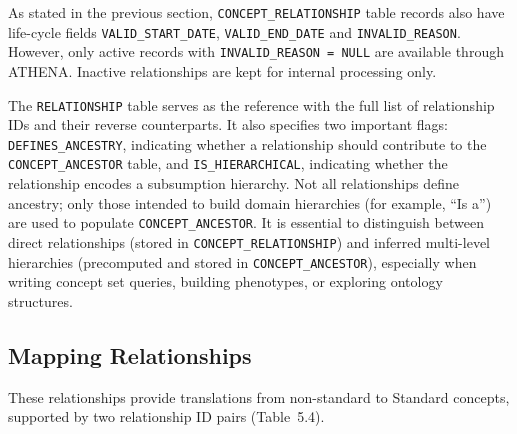 \documentclass[
  letterpaper,
  paper=7in:10in,
  pagesize=pdftex,
  headinclude=on,
  footinclude=on,
  12pt]{scrbook}
\begin{document}
As stated in the previous section, \texttt{CONCEPT\_RELATIONSHIP} table
records also have life-cycle fields \texttt{VALID\_START\_DATE},
\texttt{VALID\_END\_DATE} and \texttt{INVALID\_REASON}. However, only
active records with \texttt{INVALID\_REASON\ =\ NULL} are available
through ATHENA. Inactive relationships are kept for internal processing
only.

The \texttt{RELATIONSHIP} table serves as the reference with the full
list of relationship IDs and their reverse counterparts. It also
specifies two important flags: \texttt{DEFINES\_ANCESTRY}, indicating
whether a relationship should contribute to the
\texttt{CONCEPT\_ANCESTOR} table, and \texttt{IS\_HIERARCHICAL},
indicating whether the relationship encodes a subsumption hierarchy. Not
all relationships define ancestry; only those intended to build domain
hierarchies (for example, ``Is a'') are used to populate
\texttt{CONCEPT\_ANCESTOR}. It is essential to distinguish between
direct relationships (stored in \texttt{CONCEPT\_RELATIONSHIP}) and
inferred multi-level hierarchies (precomputed and stored in
\texttt{CONCEPT\_ANCESTOR}), especially when writing concept set
queries, building phenotypes, or exploring ontology structures.

\subsection{Mapping Relationships}\label{mapping-relationships}

These relationships provide translations from non-standard to Standard
concepts, supported by two relationship ID pairs (Table~5.4).
\end{document}
